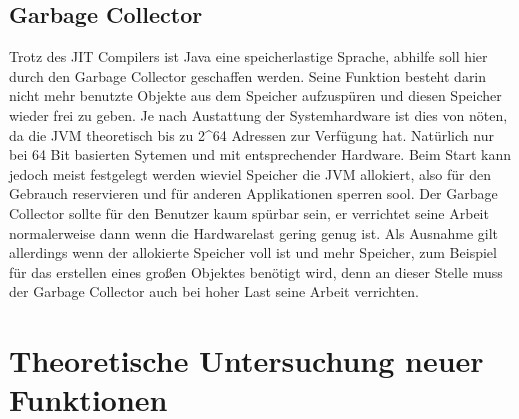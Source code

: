 \section{Garbage Collector}
\label{sec:GC}
Trotz des JIT Compilers ist Java eine speicherlastige Sprache, abhilfe soll hier
durch den Garbage Collector geschaffen werden. Seine Funktion besteht darin
nicht mehr benutzte Objekte aus dem Speicher aufzuspüren und diesen Speicher
wieder frei zu geben. Je nach Austattung der Systemhardware ist dies von nöten,
da die JVM theoretisch bis zu 2\textasciicircum64 Adressen zur Verfügung hat.
Natürlich nur bei 64 Bit basierten Sytemen und mit entsprechender Hardware. Beim Start kann 
jedoch meist festgelegt werden wieviel Speicher die JVM allokiert, also
für den Gebrauch reservieren und für anderen Applikationen sperren sool. Der
Garbage Collector sollte für den Benutzer kaum spürbar sein, er verrichtet seine Arbeit
normalerweise dann wenn die Hardwarelast gering genug ist. Als Ausnahme gilt
allerdings wenn der allokierte Speicher voll ist und mehr Speicher, zum Beispiel für das
erstellen eines großen Objektes benötigt wird, denn an dieser Stelle muss der
Garbage Collector auch bei hoher Last seine Arbeit verrichten.

\chapter{Theoretische Untersuchung neuer Funktionen}
\label{sec:Theorie}

